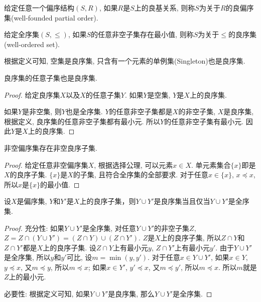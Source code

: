 \begin{definition}[良偏序集]
	给定任意一个偏序结构$(S,R)$, 如果$R$是$S$上的良基关系, 则称$S$为关于$R$的良偏序集(well-founded partial order).
\end{definition}

\begin{definition}[良序集]
	给定全序集$(S,\leq)$, 如果$S$的任意非空子集存在最小值, 则称$S$为关于$\leq$的良序集(well-ordered set).
\end{definition}

根据定义可知, 空集是良序集, 只含有一个元素的单例集(Singleton)也是良序集.

\begin{proposition}
	良序集的任意子集也是良序集.
\end{proposition}

\begin{proof}
	给定良序集$X$以及$X$的任意子集$Y$. 如果$Y$是空集, $Y$是$X$上的良序集.
	
	如果$Y$是非空集, 则$Y$也是全序集. $Y$的任意非空子集都是$X$的非空子集, $X$是良序集, 根据定义, 良序集的任意非空子集都有最小元. 所以$Y$的任意非空子集有最小元. 因此$Y$是$X$上的良序集.
\end{proof}

\begin{proposition}
	非空偏序集存在非空良序子集.
\end{proposition}

\begin{proof}
	给定任意非空偏序集$X$, 根据选择公理, 可以元素$x\in X$. 单元素集合$\{x\}$即是$X$的良序子集. $\{x\}$是$X$的子集, 且符合全序集的全部要求. 对于任意$x\in \{x\}$, $x\preccurlyeq x$, 所以$x$是$\{x\}$的最小值.
\end{proof}

\begin{proposition}
	设$X$是偏序集, $Y$和$Y'$是$X$上的良序子集，则$Y\cup Y'$是良序集当且仅当$Y\cup Y'$是全序集.
\end{proposition}

\begin{proof}
	充分性: 如果$Y\cup Y'$是全序集, 对任意$Y\cup Y'$的非空子集$Z$, $Z=Z\cap (Y\cup Y')=(Z\cap Y)\cup (Z\cap Y')$. $Z$是$X$上的良序子集, 所以$Z\cap Y$和$Z\cap Y'$都是$X$上的良序子集. 设$Z\cap Y$上有最小元$y$, $Z\cap Y'$上有最小元$y'$. 由于$Y\cup Y'$是全序集, 所以$y$和$y'$可比, 设$m=\min (y, y')$. 对于任意$x\in Y\cup Y'$, 如果$x\in Y$, $y\preccurlyeq x$, 又$m\preccurlyeq y$, 所以$m\preccurlyeq x$; 如果$x\in Y'$, $y'\preccurlyeq x$, 又$m\preccurlyeq y'$, 所以$m\preccurlyeq x$. 所以$m$就是$Z$上的最小元.
	
	必要性: 根据定义可知, 如果$Y\cup Y'$是良序集, 那么$Y\cup Y'$是全序集.
\end{proof}


